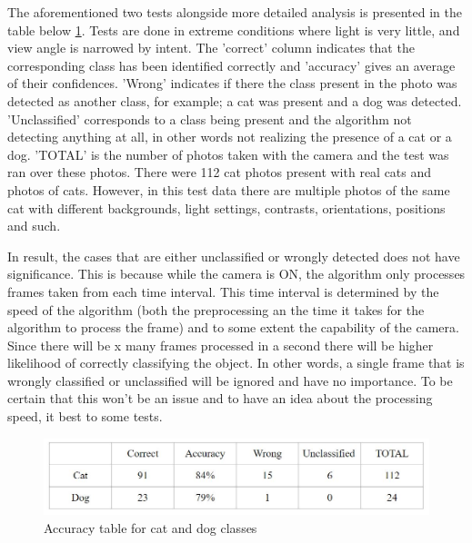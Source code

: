 \begin{enumerate}
The aforementioned two tests alongside more detailed analysis is presented in the table below \ref{fig:Table}. Tests are done in extreme conditions where light is very little, and view angle is narrowed by intent. The 'correct' column indicates that the corresponding class has been identified correctly and 'accuracy' gives an average of their confidences. 'Wrong' indicates if there the class present in the photo was detected as another class, for example; a cat was present and a dog was detected. 'Unclassified' corresponds to a class being present and the algorithm not detecting anything at all, in other words not realizing the presence of a cat or a dog. 'TOTAL' is the number of photos taken with the camera and the test was ran over these photos. There were 112 cat photos present with real cats and photos of cats. However, in this test data there are multiple photos of the same cat with different backgrounds, light settings, contrasts, orientations, positions and such. 

In result, the cases that are either unclassified or wrongly detected does not have significance. This is because while the camera is ON, the algorithm only processes frames taken from each time interval. This time interval is determined by the speed of the algorithm (both the preprocessing an the time it takes for the algorithm to process the frame) and to some extent the capability of the camera. Since there will be x many frames processed in a second there will be higher likelihood of correctly classifying the object. In other words, a single frame that is wrongly classified or unclassified will be ignored and have no importance. To be certain that this won't be an issue and to have an idea about the processing speed, it best to some tests. 

\begin{figure}[h!]
    \centering
    \includegraphics[width=1\linewidth]{content/010_introduction/img/table.JPG}
    \caption{Accuracy table for cat and dog classes}
    \label{fig:Table}
\end{figure}


\end{enumerate}
